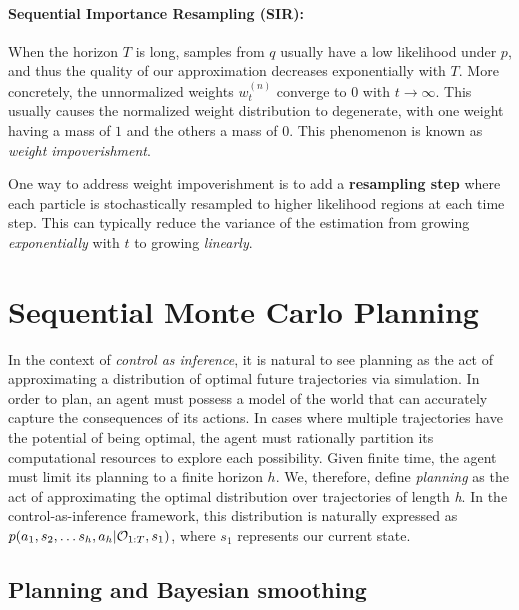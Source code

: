 \paragraph{Sequential Importance Resampling (SIR):}  When the horizon $T$ is long, samples from $q$ usually have a low likelihood under $p$, and thus the quality of our approximation decreases exponentially with $T$. More concretely, the unnormalized weights $w^{(n)}_t$ converge to $0$ with $t \rightarrow \infty$. This usually causes the normalized weight distribution to degenerate, with one weight having a mass of $1$ and the others a mass of $0$. This phenomenon is known as \emph{weight impoverishment}.

One way to address weight impoverishment is to add a \textbf{resampling step} where each particle is stochastically resampled to higher likelihood regions at each time step. 
This can typically reduce the variance of the estimation from growing \emph{exponentially} with $t$ to growing \emph{linearly}. 




















\section{Sequential Monte Carlo Planning}
\label{sec:smcp}
In the context of \textit{control as inference}, it is natural to see planning as the act of approximating a distribution of optimal future trajectories via simulation. In order to plan, an agent must possess a model of the world that can accurately capture the consequences of its actions. In cases where multiple trajectories have the potential of being optimal, the agent must rationally partition its computational resources to explore each possibility. Given finite time, the agent must limit its planning to a finite horizon $h$. We, therefore, define \textit{planning} as the act of approximating the optimal distribution over trajectories of length \textit{h}. In the control-as-inference framework, this distribution is naturally expressed as $p(a_1, s_2, \dots s_h, a_h | {\mathcal{O}}_{1:T}, s_1)$, where $s_1$ represents our current state. 


\subsection{Planning and Bayesian smoothing}

